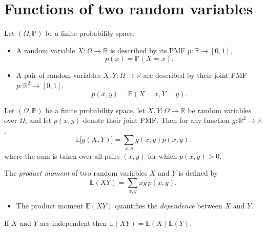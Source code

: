 \documentclass[lecture]{csm}
\newcommand{\R}{\mathbb{R}}
\newcommand{\prob}{\mathbb{P}}
\newcommand{\expe}{\mathbb{E}}
\def\it{\item}
\def\bit{\begin{itemize}}
\def\eit{\end{itemize}}
\begin{document}
\maketitle
\tableofcontents

\section{Functions of two random variables}
Let $(\Omega,\prob)$ be a finite probability space.
\bit
\it A random variable $X:\Omega\to\R$ is described by its PMF $p:\R\to[0,1]$, 
\[
p(x) = \prob(X=x).
\]
\it A pair of random variables $X,Y:\Omega\to\R$ are described by their joint PMF $p:\R^2\to[0,1]$, 
\[
p(x,y) = \prob(X=x,Y=y).
\]
\eit

\begin{lemma}\label{lem:lus2}
Let $(\Omega,\prob)$ be a finite probability space, let $X,Y:\Omega\to\R$ be random variables over $\Omega$, and let $p(x,y)$ denote their joint PMF. Then for any function $g:\R^2\to\R$,
\[
\expe\big[g(X,Y)\big] = \sum_{x,y} g(x,y)p(x,y).
\]
where the sum is taken over all pairs $(x,y)$ for which $p(x,y)>0$.
\end{lemma}
\proofomitted

\break %


\begin{definition}
The \emph{product moment} of two random variables $X$ and $Y$ is defined by
\[
\expe(XY) = \sum_{x,y} xy\,p(x,y).
\]
\end{definition}

\bit
\it The product moment $\expe(XY)$ quantifies the \emph{dependence} between $X$ and $Y$.
\eit

\begin{lemma}\label{lem:independent_implies_uncorrelated}
If $X$ and $Y$ are independent then $\expe(XY)=\expe(X)\expe(Y)$.
\end{lemma}
\end{document}
